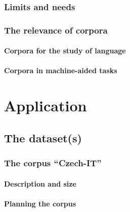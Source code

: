 \documentclass[
  a4paper,
  twoside,
  12pt,
  chapterprefix=false,
  bibliography=totocnumbered,
  listof=flat]{scrbook}
\begin{document}
\hypertarget{limits-and-needs}{%
\section{Limits and needs}\label{limits-and-needs}}

\hypertarget{the-relevance-of-corpora}{%
\section{The relevance of corpora}\label{the-relevance-of-corpora}}

\hypertarget{corpora-for-the-study-of-language}{%
\subsection{Corpora for the study of language}\label{corpora-for-the-study-of-language}}

\hypertarget{corpora-in-machine-aided-tasks}{%
\subsection{Corpora in machine-aided tasks}\label{corpora-in-machine-aided-tasks}}

\part{Application}

\hypertarget{the-datasets}{%
\chapter{The dataset(s)}\label{the-datasets}}

\hypertarget{the-corpus-czech-it}{%
\section{The corpus ``Czech-IT''}\label{the-corpus-czech-it}}

\hypertarget{description-and-size-1}{%
\subsection{Description and size}\label{description-and-size-1}}

\hypertarget{planning-the-corpus}{%
\subsection{Planning the corpus}\label{planning-the-corpus}}
\end{document}
